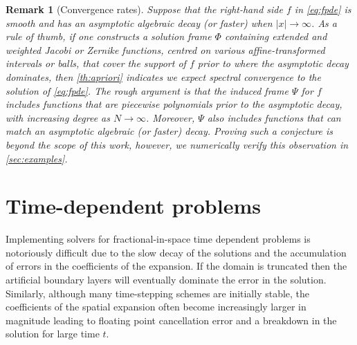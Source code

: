 \documentclass[10pt,a4paper]{article}
\newtheorem{remark}{Remark}[section]
\numberwithin{equation}{section}
\begin{document}
\begin{remark}[Convergence rates]
Suppose that the right-hand side $f$ in \cref{eq:fpde} is smooth and has an asymptotic algebraic decay (or faster) when $|x| \to \infty$. As a rule of thumb, if one constructs a solution frame $\Phi$ containing extended and weighted Jacobi or Zernike functions, centred on various affine-transformed intervals or balls, that cover the support of $f$ prior to where the asymptotic decay dominates, then \cref{th:apriori} indicates we expect \emph{spectral} convergence to the solution of \cref{eq:fpde}. The rough argument is that the induced frame $\Psi$ for $f$ includes functions that are piecewise polynomials prior to the asymptotic decay, with increasing degree as $N \to \infty$. Moreover, $\Psi$ also includes functions that can match an asymptotic algebraic (or faster) decay. Proving such a conjecture is beyond the scope of this work, however, we numerically verify this observation in \cref{sec:examples}.
\end{remark}



\section{Time-dependent problems}
\label{sec:time-dependent}
Implementing solvers for fractional-in-space time dependent problems is notoriously difficult due to the slow decay of the solutions and the accumulation of errors in the coefficients of the expansion. If the domain is truncated then the artificial boundary layers will eventually dominate the error in the solution. Similarly, although many time-stepping schemes are initially stable, the coefficients of the spatial expansion often become increasingly larger in magnitude leading to floating point cancellation error and a breakdown in the solution for large time $t$. 
\end{document}

